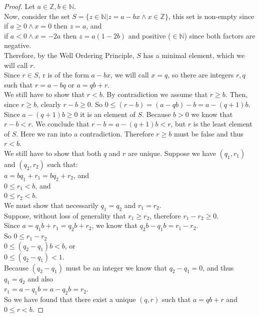 \begin{proof}
Let $a \in \mathbb{Z}, b \in \mathbb{N}.$ \\
Now, consider the set $S=\{z \in \mathbb{N} | z= a - bx \land x \in \mathbb{Z} \}$, this set is non-empty since\\
\hspace*{0.5 cm}if $a \geq 0 \land x=0$ then $z=a$, and\\
\hspace*{0.5 cm}if $a < 0 \land x=-2a$ then $z=a(1-2b)$ and positive ($\in \mathbb{N}$) since both factors are negative.\\
Therefore, by the Well Ordering Principle, $S$ has a minimal element, which we will call $r$.\\
Since $r \in S$, r is of the form $a-bx$, we will call $x=q$, so there are integers $r,q$ such that $r=a-bq$ or $a=qb+r$.\\
\newline
We still have to show that $r < b$. By contradiction we assume that $r \geq b$. Then, since $r \geq b$, clearly $r-b \geq 0$.
So $0 \leq (r-b) = (a-qb)-b=a-(q+1)b$. Since $a-(q+1)b \geq 0$ it is an element of $S$. Because $b>0$ we know that $r-b<r$.
We conclude that $r-b=a-(q+1)b < r$, but $r$ is the least element of $S$. Here we ran into a contradiction. Therefore
$r \geq b$ must be false and thus $r < b$.\\
\newline
We still have to show that both $q$ and $r$ are unique. Suppose we have $(q_1,r_1)$ and $(q_2,r_2)$ such that:\\
\hspace*{0.5 cm}$a = bq_1+r_1 = bq_2+r_2$, and\\
\hspace*{0.5 cm}$0 \le r_1 < b$, and\\
\hspace*{0.5 cm}$0 \le r_2 < b$.\\
We must show that necessarily $q_1=q_2$ and $r_1=r_2$.\\
Suppose, without loss of generality that $r_1 \geq r_2$, therefore $r_1-r_2 \geq 0$.\\
Since $a=q_1b+r_1=q_2b+r_2$, we know that $q_2b-q_1b=r_1-r_2$.\\
So
\hspace*{0.5 cm}$0 \leq r_1 -r_2$ \\
\hspace*{0.5 cm}$0 \leq (q_2 -q_1)b < b$, or \\
\hspace*{0.5 cm}$0 \leq (q_2 -q_1) < 1$.\\
Because $(q_2-q_1)$ must be an integer we know that $q_2-q_1=0$, and thus $q_1=q_2$ and also\\
$r_1=a-q_1 b= a - q_2 b = r_2$.\\
\newline
So we have found that there exist a unique $(q,r)$ such that $a=q b + r$ and $0 \leq r < b$. 
\end{proof}